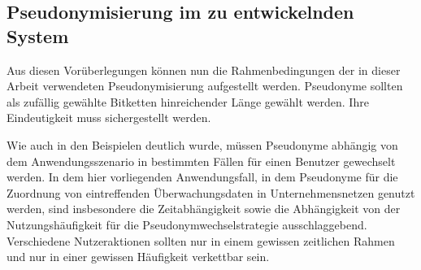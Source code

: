 \subsection{Pseudonymisierung im zu entwickelnden System}


Aus diesen Vorüberlegungen können nun die Rahmenbedingungen der in dieser Arbeit verwendeten Pseudonymisierung aufgestellt werden.
Pseudonyme sollten als zufällig gewählte Bitketten hinreichender Länge gewählt werden. Ihre Eindeutigkeit muss sichergestellt werden.

Wie auch in den Beispielen deutlich wurde, müssen Pseudonyme abhängig von dem Anwendungsszenario in bestimmten Fällen für einen Benutzer gewechselt werden. In dem hier vorliegenden Anwendungsfall, in dem Pseudonyme für die Zuordnung von eintreffenden Überwachungsdaten in Unternehmensnetzen genutzt werden, sind insbesondere die Zeitabhängigkeit sowie die Abhängigkeit von der Nutzungshäufigkeit für die Pseudonymwechselstrategie ausschlaggebend. Verschiedene Nutzeraktionen sollten nur in einem gewissen zeitlichen Rahmen und nur in einer gewissen Häufigkeit verkettbar sein.

